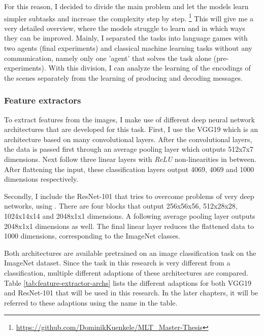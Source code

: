For this reason, I decided to divide the main problem and let the models learn simpler subtasks and increase the complexity step by step.
\footnote{\href{https://github.com/DominikKuenkele/MLT\_Master-Thesis}{https://github.com/DominikKuenkele/MLT\_Master-Thesis}}
This will give me a very detailed overview, where the models struggle to learn and in which ways they can be improved.
Mainly, I separated the tasks into language games with two agents (final experiments) and classical machine learning tasks without any communication, namely only one 'agent' that solves the task alone (pre-experiments).
With this division, I can analyze the learning of the encodings of the scenes separately from the learning of producing and decoding messages.

\subsubsection{Feature extractors}
To extract features from the images, I make use of different deep neural network architectures that are developed for this task.
First, I use the  VGG19 \citep{Simonyan2015} which is an architecture based on many convolutional layers.
After the convolutional layers, the data is passed first through an average pooling layer which outputs 512x7x7 dimensions.
Next follow three linear layers with \emph{ReLU} non-linearities in between.
After flattening the input, these classification layers output 4069, 4069 and 1000 dimensions respectively.

Secondly, I include the ResNet-101 \citep{He2016} that tries to overcome problems of very deep networks, using .
There are four blocks that output 256x56x56, 512x28x28, 1024x14x14 and 2048x1x1 dimensions.
A following average pooling layer outputs 2048x1x1 dimensions as well.
The final linear layer reduces the flattened data to 1000 dimensions, corresponding to the ImageNet classes.

Both architectures are available pretrained on an image classification task on the ImageNet dataset.
Since the task in this research is very different from a classification, multiple different adaptions of these architectures are compared. 
Table \ref{tab:feature-extractor-archs} lists the different adaptions for both VGG19 and ResNet-101 that will be used in this research.
In the later chapters, it will be referred to these adaptions using the name in the table.


